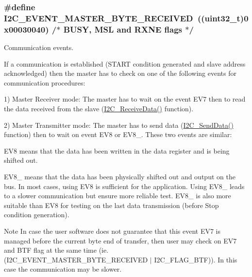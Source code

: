 \subsubsection[{\texorpdfstring{I2\+C\+\_\+\+E\+V\+E\+N\+T\+\_\+\+M\+A\+S\+T\+E\+R\+\_\+\+B\+Y\+T\+E\+\_\+\+R\+E\+C\+E\+I\+V\+ED}{I2C_EVENT_MASTER_BYTE_RECEIVED}}]{\setlength{\rightskip}{0pt plus 5cm}\#define I2\+C\+\_\+\+E\+V\+E\+N\+T\+\_\+\+M\+A\+S\+T\+E\+R\+\_\+\+B\+Y\+T\+E\+\_\+\+R\+E\+C\+E\+I\+V\+ED~(({\bf uint32\+\_\+t})0x00030040)  /$\ast$ B\+U\+S\+Y, M\+S\+L and R\+X\+N\+E flags $\ast$/}\hypertarget{group___i2_c___events_ga6bcf2ae49961e07e27cf9fdf334719e3}{}\label{group___i2_c___events_ga6bcf2ae49961e07e27cf9fdf334719e3}


Communication events. 

If a communication is established (S\+T\+A\+RT condition generated and slave address acknowledged) then the master has to check on one of the following events for communication procedures\+:

1) Master Receiver mode\+: The master has to wait on the event E\+V7 then to read the data received from the slave (\hyperlink{group___i2_c___private___functions_gaeaaa4b6f77f50eb57465148c55d27fb2}{I2\+C\+\_\+\+Receive\+Data()} function).

2) Master Transmitter mode\+: The master has to send data (\hyperlink{group___i2_c___private___functions_ga7bd9e70b8eafde0dd5eb42b0d95fe1a9}{I2\+C\+\_\+\+Send\+Data()} function) then to wait on event E\+V8 or E\+V8\+\_. These two events are similar\+:
\begin{DoxyItemize}
\item E\+V8 means that the data has been written in the data register and is being shifted out.
\item E\+V8\+\_ means that the data has been physically shifted out and output on the bus. In most cases, using E\+V8 is sufficient for the application. Using E\+V8\+\_ leads to a slower communication but ensure more reliable test. E\+V8\+\_ is also more suitable than E\+V8 for testing on the last data transmission (before Stop condition generation).
\end{DoxyItemize}

\begin{DoxyNote}{Note}
In case the user software does not guarantee that this event E\+V7 is managed before the current byte end of transfer, then user may check on E\+V7 and B\+TF flag at the same time (ie. (I2\+C\+\_\+\+E\+V\+E\+N\+T\+\_\+\+M\+A\+S\+T\+E\+R\+\_\+\+B\+Y\+T\+E\+\_\+\+R\+E\+C\+E\+I\+V\+ED $\vert$ I2\+C\+\_\+\+F\+L\+A\+G\+\_\+\+B\+TF)). In this case the communication may be slower. 
\end{DoxyNote}


